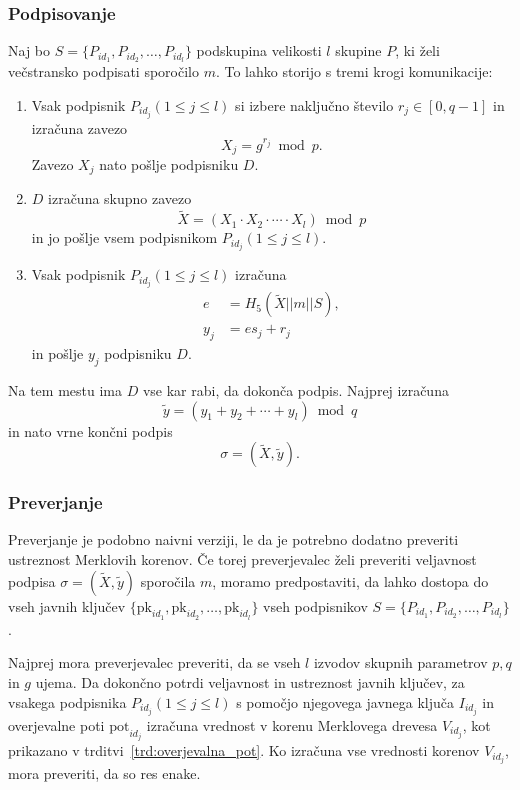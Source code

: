 \documentclass[isrm2, tisk]{fmfdelo}
\begin{document}
\subsubsection{Podpisovanje}
Naj bo $S = \{P_{id_1}, P_{id_2}, \dots, P_{id_l}\}$ podskupina velikosti $l$ skupine $P$, ki želi 
večstransko podpisati sporočilo $m$. To lahko storijo s tremi krogi komunikacije:
\begin{enumerate}
    \item Vsak podpisnik $P_{id_j} (1 \le j \le l)$ si izbere naključno število $r_j \in [0, q - 1]$ 
        in izračuna zavezo
        $$ 
        X_j = g^{r_j} \bmod p.
        $$
        Zavezo $X_j$ nato pošlje podpisniku $D$.
    \item $D$ izračuna skupno zavezo
        $$ 
        \tilde{X} = (X_1 \cdot X_2 \cdot \cdots \cdot X_l) \bmod p
        $$
        in jo pošlje vsem podpisnikom $P_{id_j} (1 \le j \le l)$.
    \item Vsak podpisnik $P_{id_j} (1 \le j \le l)$ izračuna
        \begin{align*}
            e &= H_5(\tilde{X} || m || S), \\
            y_j &= e s_j + r_j
        \end{align*}
        in pošlje $y_j$ podpisniku $D$.
\end{enumerate}
Na tem mestu ima $D$ vse kar rabi, da dokonča podpis. Najprej izračuna
$$
\tilde{y} = (y_1 + y_2 + \cdots + y_l) \bmod q
$$
in nato vrne končni podpis
$$
\sigma = (\tilde{X}, \tilde{y}).
$$

\subsubsection{Preverjanje}
Preverjanje je podobno naivni verziji, le da je potrebno dodatno preveriti ustreznost Merklovih
korenov. Če torej preverjevalec želi preveriti veljavnost podpisa $\sigma = (\tilde{X}, \tilde{y})$
sporočila $m$, moramo predpostaviti, da lahko dostopa do vseh javnih ključev $\{\text{pk}_{id_1},
\text{pk}_{id_2}, \dots, \text{pk}_{id_l}\}$ vseh podpisnikov $S = \{P_{id_1}, P_{id_2}, \dots, 
P_{id_l}\}$.

Najprej mora preverjevalec preveriti, da se vseh $l$ izvodov skupnih parametrov $p, q$ in $g$ ujema.
Da dokončno potrdi veljavnost in ustreznost javnih ključev, za vsakega podpisnika $P_{id_j} (1 \le
j \le l)$ s pomočjo njegovega javnega ključa $I_{id_j}$ in overjevalne poti $\text{pot}_{id_j}$
izračuna vrednost v korenu Merklovega drevesa $V_{id_j}$, kot prikazano v trditvi~\ref{trd:overjevalna_pot}.
Ko izračuna vse vrednosti korenov $V_{id_j}$, mora preveriti, da so res enake. 
\end{document}
